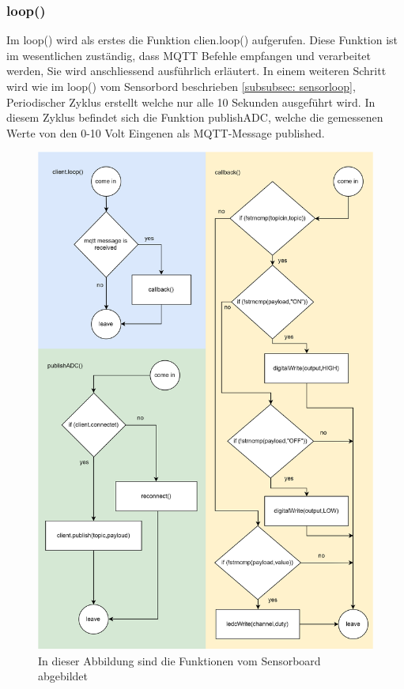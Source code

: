 \subsubsection{loop()}
Im loop() wird als erstes die Funktion clien.loop() aufgerufen. Diese Funktion ist im wesentlichen zuständig, dass MQTT Befehle empfangen und verarbeitet werden, Sie wird anschliessend ausführlich erläutert. In einem weiteren Schritt wird wie im loop() vom Sensorbord beschrieben \ref{subsubsec: sensorloop}, Periodischer Zyklus erstellt welche nur alle 10 Sekunden ausgeführt wird. In diesem Zyklus befindet sich die Funktion publishADC, welche die gemessenen Werte von den 0-10 Volt Eingenen als MQTT-Message published.
\begin{figure}[H]
	\centering
	\includegraphics[width=\textwidth]{graphics/FunktionenAktor.png}
	\caption{In dieser Abbildung sind die Funktionen vom Sensorboard abgebildet}
	\label{pic: funktionen Aktor}
\end{figure}   
